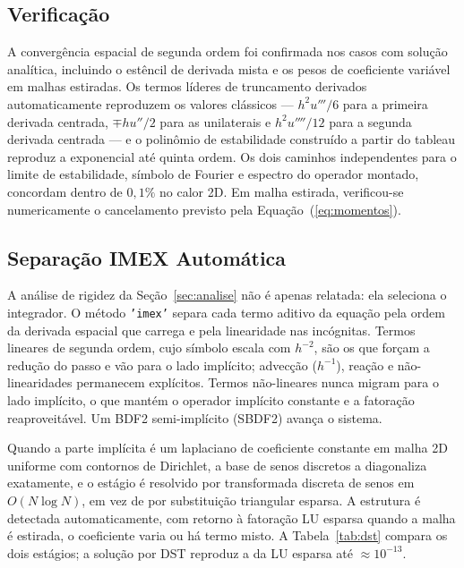 \documentclass[10pt,brazil,english]{article}
\begin{document}
\subsection{Verificação}

A convergência espacial de segunda ordem foi confirmada nos casos com solução analítica, incluindo o estêncil de derivada mista e os pesos de coeficiente variável em malhas estiradas. Os termos líderes de truncamento derivados automaticamente reproduzem os valores clássicos --- $h^2u'''/6$ para a primeira derivada centrada, $\mp h u''/2$ para as unilaterais e $h^2u''''/12$ para a segunda derivada centrada --- e o polinômio de estabilidade construído a partir do tableau reproduz a exponencial até quinta ordem. Os dois caminhos independentes para o limite de estabilidade, símbolo de Fourier e espectro do operador montado, concordam dentro de $0{,}1\%$ no calor 2D. Em malha estirada, verificou-se numericamente o cancelamento previsto pela Equação~(\ref{eq:momentos}).

\subsection{Separação IMEX Automática}
\label{sec:imex}

A análise de rigidez da Seção~\ref{sec:analise} não é apenas relatada: ela
seleciona o integrador. O método \texttt{'imex'} separa cada termo aditivo da
equação pela ordem da derivada espacial que carrega e pela linearidade nas
incógnitas. Termos lineares de segunda ordem, cujo símbolo escala com $h^{-2}$,
são os que forçam a redução do passo e vão para o lado implícito; advecção
($h^{-1}$), reação e não-linearidades permanecem explícitos. Termos não-lineares
nunca migram para o lado implícito, o que mantém o operador implícito constante
e a fatoração reaproveitável. Um BDF2 semi-implícito (SBDF2) avança o sistema.

Quando a parte implícita é um laplaciano de coeficiente constante em malha 2D
uniforme com contornos de Dirichlet, a base de senos discretos a diagonaliza
exatamente, e o estágio é resolvido por transformada discreta de senos em
$O(N \log N)$, em vez de por substituição triangular esparsa. A estrutura é
detectada automaticamente, com retorno à fatoração LU esparsa quando a malha é
estirada, o coeficiente varia ou há termo misto. A Tabela~\ref{tab:dst} compara
os dois estágios; a solução por DST reproduz a da LU esparsa até
$\approx10^{-13}$.
\end{document}
